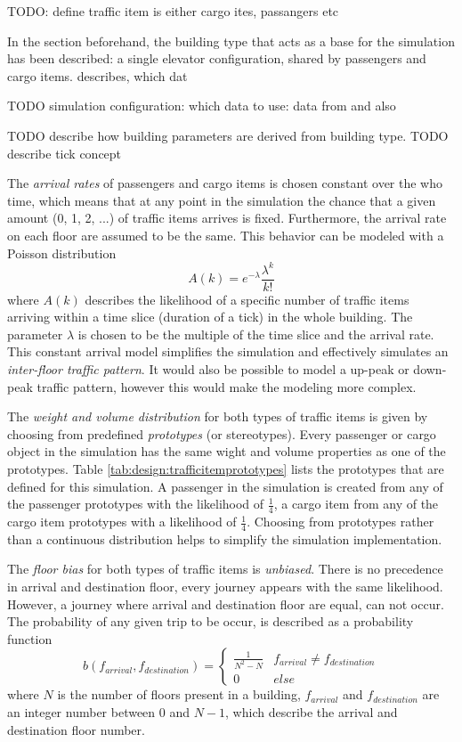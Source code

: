 TODO: define traffic item is either cargo ites, passangers etc

In the section beforehand, the building type that acts as a base for the simulation has been described:
a single elevator configuration, shared by passengers and cargo items.
\textcite[][p.~347]{barney2016handbook} describes, which dat




TODO simulation configuration:
which data to use: 
data from \autocite[][]{kone2017overview} 
and also \autocite[][p.~349]{barney2016handbook}

TODO describe how building parameters are derived from building type.
TODO describe tick concept


The \emph{arrival rates} of passengers and cargo items is chosen constant over the who time, 
which means that at any point in the simulation the chance that a given amount (0, 1, 2, ...) of traffic items arrives is fixed.
Furthermore, the arrival rate on each floor are assumed to be the same.
This behavior can be modeled with a Poisson distribution
$$ A(k) = e^{-\lambda}\frac{\lambda^k}{k!} $$
where $ A(k) $ describes the likelihood of a specific number of traffic items arriving within a time slice (duration of a tick) in the whole building.
The parameter $ \lambda $ is chosen to be the multiple of the time slice and the arrival rate.
This constant arrival model simplifies the simulation and effectively simulates an \emph{inter-floor traffic pattern}.
It would also be possible to model a up-peak or down-peak traffic pattern, however this would make the modeling more complex.

The \emph{weight and volume distribution} for both types of traffic items is given by choosing from predefined \emph{prototypes} (or stereotypes).
Every passenger or cargo object in the simulation has the same wight and volume properties as one of the prototypes.
Table \ref{tab:design:trafficitemprototypes} lists the prototypes that are defined for this simulation.
A passenger in the simulation is created from any of the passenger prototypes with the likelihood of $ \frac{1}{4} $, a cargo item from any of the cargo item prototypes with a likelihood of $ \frac{1}{4} $.
Choosing from prototypes rather than a continuous distribution helps to simplify the simulation implementation.

The \emph{floor bias} for both types of traffic items is \emph{unbiased}. 
There is no precedence in arrival and destination floor, every journey appears with the same likelihood.
However, a journey where arrival and destination floor are equal, can not occur.
The probability of any given trip to be occur, is described as a probability function
$$ b(f_{arrival}, f_{destination}) =
    \begin{cases} 
      \frac{1}{N^2 - N} & f_{arrival} \neq f_{destination} \\
      0 & else
   \end{cases}
$$
where $ N $ is the number of floors present in a building, $ f_{arrival} $ and  $ f_{destination} $ are an integer number between 0 and $ N - 1$, which describe the arrival and destination floor number.

